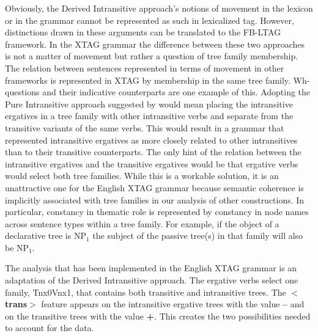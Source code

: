 Obviously, the Derived Intransitive approach's notions of movement in the
lexicon or in the grammar cannot be represented as such in lexicalized tag.
However, distinctions drawn in these arguments can be translated to the FB-LTAG
framework.  In the XTAG grammar the difference between these two approaches is
not a matter of movement but rather a question of tree family membership.  The
relation between sentences represented in terms of movement in other frameworks
is represented in XTAG by membership in the same tree family. Wh-questions and
their indicative counterparts are one example of this.  Adopting the Pure
Intransitive approach suggested by \cite{Napoli88} would mean placing the
intransitive ergatives in a tree family with other intransitive verbs and
separate from the transitive variants of the same verbs.  This would result in
a grammar that represented intransitive ergatives as more closely related to
other intransitives than to their transitive counterparts.  The only hint of
the relation between the intransitive ergatives and the transitive ergatives
would be that ergative verbs would select both tree families. While
this is a workable solution, it is an unattractive one for the English XTAG
grammar because semantic coherence is implicitly associated with tree families
in our analysis of other constructions.  In particular, constancy in thematic
role is represented by constancy in node names across sentence types within a
tree family. For example, if the object of a declarative tree is NP$_{1}$ the
subject of the passive tree(s) in that family will also be NP$_{1}$.

The analysis that has been implemented in the English XTAG grammar is an
adaptation of the Derived Intransitive approach. The ergative verbs select one
family, Tnx0Vnx1, that contains both transitive and intransitive trees.  The
{\bf$<$trans$>$} feature appears on the intransitive ergative trees with the
value {\bf --} and on the transitive trees with the value {\bf +}.  This
creates the two possibilities needed to account for the data.

